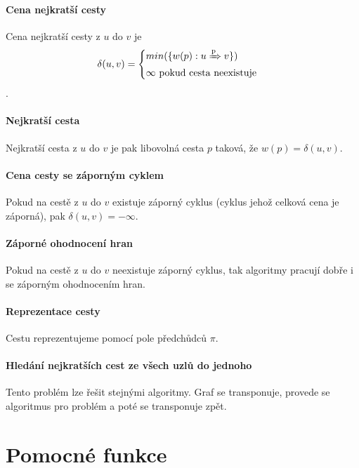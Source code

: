 \paragraph*{Cena nejkratší cesty} Cena nejkratší cesty z $u$ do $v$ je $$
\delta(u, v) = \begin{cases}
    min( \{ w(p) : u \xRightarrow{\text{p}} v \} ) \\
    \infty ~ \text{pokud cesta neexistuje}
\end{cases}
$$.

\paragraph*{Nejkratší cesta} Nejkratší cesta z $u$ do $v$ je pak libovolná cesta $p$ taková, že $w(p) = \delta(u, v)$.

\paragraph*{Cena cesty se záporným cyklem} Pokud na cestě z $u$ do $v$ existuje záporný cyklus (cyklus jehož celková cena je záporná), pak $\delta(u, v) = - \infty$.

\paragraph*{Záporné ohodnocení hran} Pokud na cestě z $u$ do $v$ neexistuje záporný cyklus, tak algoritmy pracují dobře i se záporným ohodnocením hran.

\paragraph*{Reprezentace cesty} Cestu reprezentujeme pomocí pole předchůdců $\pi$.

\paragraph*{Hledání nejkratších cest ze všech uzlů do jednoho} Tento problém lze řešit stejnými algoritmy. Graf se transponuje, provede se algoritmus pro problém  a poté se transponuje zpět.


\section{Pomocné funkce}



